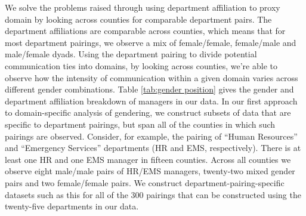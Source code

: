 \documentclass{pnastwo}
\begin{document}
\begin{article}
 We solve the problems raised through using department affiliation to proxy domain by looking across counties for comparable department pairs. The department affiliations are comparable across counties, which means that for most department pairings, we observe a mix of female/female, female/male and male/female dyads.  Using the department pairing to divide potential communication ties into domains, by looking across counties, we're able to observe how the intensity of communication within a given domain varies across different gender combinations. Table \ref{tab:gender position} gives the gender and department affiliation breakdown of managers in our data. In our first approach to domain-specific analysis of gendering, we construct subsets of data that are specific to department pairings, but span all of the counties in which such pairings are observed. Consider, for example, the pairing of ``Human Resources'' and ``Emergency Services'' departments (HR and EMS, respectively). There is at least one HR and one EMS manager in fifteen counties. Across all counties we observe eight male/male pairs of HR/EMS managers, twenty-two mixed gender pairs and two female/female pairs. We construct department-pairing-specific datasets such as this for all of the 300 pairings that can be constructed using the twenty-five departments in our data. 
 

\end{article}
\end{document}
